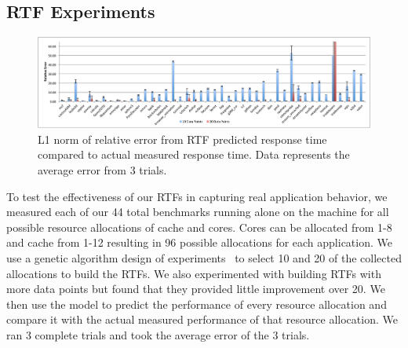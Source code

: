 

\subsection*{RTF Experiments}
\begin{figure}[!t]
	\begin{center}	
		\includegraphics[width=\textwidth]{model_accuracy.pdf}
		\caption{L1 norm of relative error from RTF predicted response time compared to actual measured response time.  Data represents the average error from 3 trials.}
		\label{model_accuracy}
	\end{center}
\end{figure}
To test the effectiveness of our RTFs in capturing real application behavior, we measured each of our 44 total benchmarks running alone on the machine for all possible resource allocations of cache and cores.  Cores can be allocated from 1-8 and cache from 1-12 resulting in 96 possible allocations for each application.   We use a genetic algorithm design of experiments~\cite{bates-aes03} to select 10 and 20 of the collected allocations to build the RTFs.  We also experimented with building RTFs with more data points but found that they provided little improvement over 20.  We then use the model to predict the performance of every resource allocation and compare it with the actual measured performance of that resource allocation.  We ran 3 complete trials and took the average error of the 3 trials. 

